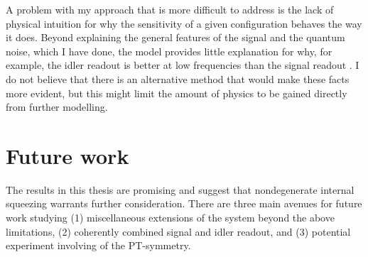 A problem with my approach that is more difficult to address is the lack of physical intuition for why the sensitivity of a given configuration behaves the way it does. Beyond explaining the general features of the signal and the quantum noise, which I have done, the model provides little explanation for why, for example, the idler readout is better at low frequencies than the signal readout . I do not believe that there is an alternative method that would make these facts more evident, but this might limit the amount of physics to be gained directly from further modelling.






\section{Future work}
\label{sec:future_work}

The results in this thesis are promising and suggest that nondegenerate internal squeezing warrants further consideration. There are three main avenues for future work studying (1) miscellaneous extensions of the system beyond the above limitations, (2) coherently combined signal and idler readout, and (3) potential experiment involving of the PT-symmetry.

